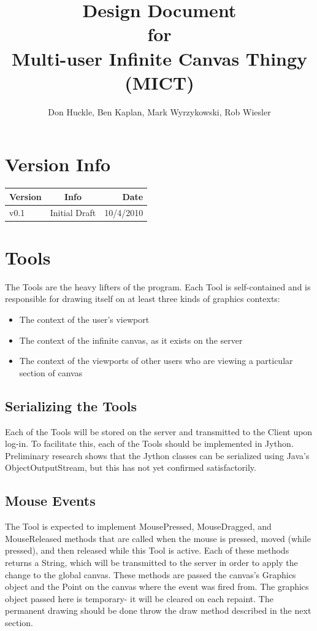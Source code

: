 \documentclass[11pt,oneside,a4paper]{article}
\title{Design Document \\ for \\ Multi-user Infinite Canvas Thingy (MICT)}
\author{Don Huckle, Ben Kaplan, Mark Wyrzykowski, Rob Wiesler}
\begin{document}
\maketitle
\tableofcontents
\pagebreak
\section{Version Info}

\begin{tabular}{| l | c | r |}  \hline
\textbf{Version} & \textbf{Info} & \textbf{Date} \\ \hline
v0.1 & Initial Draft & 10/4/2010 \\ \hline
\end{tabular}

\section{Tools}
  The Tools are the heavy lifters of the program. Each Tool is self-contained
  and is responsible for drawing itself on at least three kinds of graphics
  contexts:
 \begin{itemize}
  \item The context of the user's viewport
  \item The context of the infinite canvas, as it exists on the server
  \item The context of the viewports of other users who are viewing a particular section of canvas
 \end{itemize}

 \subsection{Serializing the Tools}
  Each of the Tools will be stored on the server and transmitted to the Client
  upon log-in. To facilitate this, each of the Tools should be implemented in
  Jython. Preliminary research shows that the Jython classes can be serialized
  using Java's ObjectOutputStream, but this has not yet confirmed satisfactorily.

 \subsection{Mouse Events}
  The Tool is expected to implement MousePressed, MouseDragged, and
  MouseReleased methods that are called when the mouse is pressed, moved (while
  pressed), and then released while this Tool is active. Each of these methods
  returns a String, which will be transmitted to the server in order to apply the
  change to the global canvas.  These methods are passed the canvas's Graphics
  object and the Point on the canvas where the event was fired from. The
  graphics object passed here is temporary- it will be cleared on each repaint.
  The permanent drawing should be done throw the draw method described in the
  next section.
\end{document}
